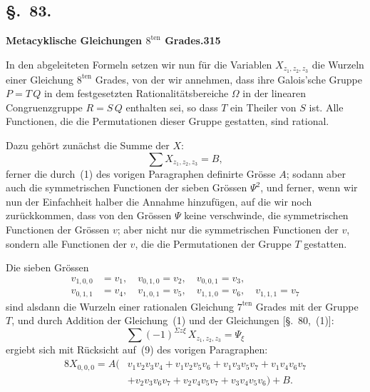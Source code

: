\documentclass[12pt,a4paper]{article}
\begin{document}
\subsection*{\S.~83.}
\textbf{Metacyklische Gleichungen $8^{\text{ten}}$ Grades.}\hfill\textbf{315}\\[4pt]

In den abgeleiteten Formeln setzen wir nun f\"ur die Variablen $X_{z_1,z_2,z_3}$ die Wurzeln einer Gleichung $8^{\text{ten}}$ Grades, von der wir annehmen, dass ihre Galois'sche Gruppe $P = T\,Q$ in dem festgesetzten Rationalit\"atsbereiche $\Omega$ in der linearen Congruenzgruppe $R = S\,Q$ enthalten sei, so dass $T$ ein Theiler von $S$ ist. Alle Functionen, die die Permutationen dieser Gruppe gestatten, sind rational.

Dazu geh\"ort zun\"achst die Summe der $X$:
\begin{equation}
\tag{1}
\sum X_{z_1,z_2,z_3} = B,
\end{equation}
ferner die durch~(1) des vorigen Paragraphen definirte Gr\"osse $A$; sodann aber auch die symmetrischen Functionen der sieben Gr\"ossen $\Psi^2$, und ferner, wenn wir nun der Einfachheit halber die Annahme hinzuf\"ugen, auf die wir noch zur\"uckkommen, dass von den Gr\"ossen $\Psi$ keine verschwinde, die symmetrischen Functionen der Gr\"ossen $v$; aber nicht nur die symmetrischen Functionen der $v$, sondern alle Functionen der $v$, die die Permutationen der Gruppe $T$ gestatten.

Die sieben Gr\"ossen
\begin{equation}
\tag{2}
\begin{aligned}
v_{1,0,0} &= v_1,\quad v_{0,1,0} = v_2,\quad v_{0,0,1} = v_3,\\
v_{0,1,1} &= v_4,\quad v_{1,0,1} = v_5,\quad v_{1,1,0} = v_6,\quad v_{1,1,1} = v_7
\end{aligned}
\end{equation}
sind alsdann die Wurzeln einer rationalen Gleichung $7^{\text{ten}}$ Grades mit der Gruppe $T$, und durch Addition der Gleichung~(1) und der Gleichungen [\S.~80,~(1)]:
\[
\sum (-1)^{\Sigma z\xi}\,X_{z_1,z_2,z_3} = \Psi_{\xi}
\]
ergiebt sich mit R\"ucksicht auf~(9) des vorigen Paragraphen:
\begin{equation}
\tag{3}
\begin{aligned}
8X_{0,0,0} = A(&v_1v_2v_3v_4 + v_1v_2v_5v_6 + v_1v_3v_5v_7 + v_1v_4v_6v_7\\
&+ v_2v_3v_6v_7 + v_2v_4v_5v_7 + v_3v_4v_5v_6) + B.
\end{aligned}
\end{equation}
\end{document}
